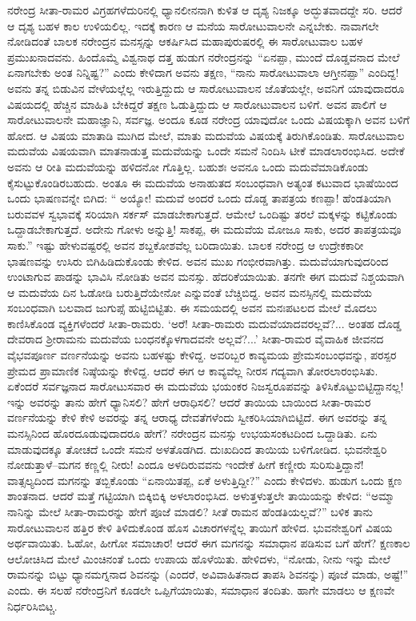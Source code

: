 ನರೇಂದ್ರ ಸೀತಾ-ರಾಮರ ವಿಗ್ರಹಗಳೆದುರಿನಲ್ಲಿ ಧ್ಯಾನಲೀನನಾಗಿ ಕುಳಿತ ಆ ದೃಶ್ಯ ನಿಜಕ್ಕೂ ಅದ್ಭುತವಾದದ್ದೇ ಸರಿ. ಆದರೆ ಆ ದೃಶ್ಯ ಬಹಳ ಕಾಲ ಉಳಿಯಲಿಲ್ಲ. ಇದಕ್ಕೆ ಕಾರಣ ಆ ಮನೆಯ ಸಾರೋಟುವಾಲನೇ ಎನ್ನಬೇಕು. ನಾವಾಗಲೇ ನೋಡಿದಂತೆ ಬಾಲಕ ನರೇಂದ್ರನ ಮನಸ್ಸನ್ನು ಆಕರ್ಷಿಸಿದ ಮಹಾಪುರುಷರಲ್ಲಿ ಈ ಸಾರೋಟುವಾಲ ಬಹಳ ಪ್ರಮುಖನಾದವನು. ಹಿಂದೊಮ್ಮೆ ವಿಶ್ವನಾಥ ದತ್ತ ಹುಡುಗ ನರೇಂದ್ರನನ್ನು “ಏನಪ್ಪಾ, ಮುಂದೆ ದೊಡ್ಡವನಾದ ಮೇಲೆ ಏನಾಗಬೇಕು ಅಂತ ನಿನ್ನಿಷ್ಟ?” ಎಂದು ಕೇಳಿದಾಗ ಅವನು ತಕ್ಷಣ, “ನಾನು ಸಾರೋಟುವಾಲಾ ಆಗ್ತೀನಪ್ಪಾ” ಎಂದಿದ್ದ! ಅವನು ತನ್ನ ಬಿಡುವಿನ ವೇಳೆಯಲ್ಲೆಲ್ಲ ಇರುತ್ತಿದ್ದುದು ಆ ಸಾರೋಟುವಾಲನ ಜೊತೆಯಲ್ಲೇ, ಅವನಿಗೆ ಯಾವುದಾದರೂ ವಿಷಯದಲ್ಲಿ ಹೆಚ್ಚಿನ ಮಾಹಿತಿ ಬೇಕಿದ್ದರೆ ತಕ್ಷಣ ಓಡುತ್ತಿದ್ದುದು ಆ ಸಾರೋಟುವಾಲನ ಬಳಿಗೆ. ಅವನ ಪಾಲಿಗೆ ಆ ಸಾರೋಟುವಾಲನೇ ಮಹಾಜ್ಞಾನಿ, ಸರ್ವಜ್ಞ. ಅಂದೂ ಕೂಡ ನರೇಂದ್ರ ಯಾವುದೋ ಒಂದು ವಿಷಯಕ್ಕಾಗಿ ಅವನ ಬಳಿಗೆ ಹೋದ. ಆ ವಿಷಯ ಮಾತಾಡಿ ಮುಗಿದ ಮೇಲೆ, ಮಾತು ಮದುವೆಯ ವಿಷಯಕ್ಕೆ ತಿರುಗಿಕೊಂಡಿತು. ಸಾರೋಟುವಾಲ ಮದುವೆಯ ವಿಷಯವಾಗಿ ಮಾತನಾಡುತ್ತ ಮದುವೆಯನ್ನು ಒಂದೇ ಸಮನೆ ನಿಂದಿಸಿ ಟೀಕೆ ಮಾಡಲಾರಂಭಿಸಿದ. ಅದೇಕೆ ಅವನು ಆ ರೀತಿ ಮದುವೆಯನ್ನು ಹಳಿದನೋ ಗೊತ್ತಿಲ್ಲ. ಬಹುಶಃ ಅವನೂ ಒಂದು ಮದುವೆಮಾಡಿಕೊಂಡು ಕೈಸುಟ್ಟುಕೊಂಡಿರಬಹುದು. ಅಂತೂ ಈ ಮದುವೆಯ ಅನಾಹುತದ ಸಂಬಂಧವಾಗಿ ಅತ್ಯಂತ ಕಟುವಾದ ಭಾಷೆಯಿಂದ ಒಂದು ಭಾಷಣವನ್ನೇ ಬಿಗಿದ: “ ಅಯ್ಯೋ! ಮದುವೆ ಅಂದರೆ ಒಂದು ದೊಡ್ಡ ತಾಪತ್ರಯ ಕಣಪ್ಪಾ! ಹೆಂಡತಿಯಾಗಿ ಬರುವವಳ ಸ್ವಭಾವಕ್ಕೆ ಸರಿಯಾಗಿ ಸರ್ಕಸ್ ಮಾಡಬೇಕಾಗುತ್ತದೆ. ಆಮೇಲೆ ಒಂದಿಷ್ಟು ತರಲೆ ಮಕ್ಕಳನ್ನು ಕಟ್ಟಿಕೊಂಡು ಒದ್ದಾಡಬೇಕಾಗುತ್ತದೆ. ಅದೇನು ಗೋಳು ಅನ್ನುತ್ತಿ! ಸಾಕಪ್ಪ, ಈ ಮದುವೆಯ ಮೋಜೂ ಸಾಕು, ಅದರ ತಾಪತ್ರಯವೂ ಸಾಕು.” ಇಷ್ಟು ಹೇಳುವಷ್ಟರಲ್ಲಿ ಅವನ ಶಬ್ದಕೋಶವೆಲ್ಲ ಬರಿದಾಯಿತು. ಬಾಲಕ ನರೇಂದ್ರ ಆ ಉದ್ರೇಕಕಾರೀ ಭಾಷಣವನ್ನು ಉಸಿರು ಬಿಗಿಹಿಡಿದುಕೊಂಡು ಕೇಳಿದ. ಅವನ ಮುಖ ಗಂಭೀರವಾಗಿತ್ತು. ಮದುವೆಯಾಗುವುದರಿಂದ ಉಂಟಾಗುವ ಪಾಡನ್ನು ಭಾವಿಸಿ ನೋಡಿತು ಅವನ ಮನಸ್ಸು. ಹೆದರಿಕೆಯಾಯಿತು. ತನಗೇ ಈಗ ಮದುವೆ ನಿಶ್ಚಯವಾಗಿ ಆ ಮದುವೆಯ ದಿನ ಓಡೋಡಿ ಬರುತ್ತಿದೆಯೇನೋ ಎನ್ನುವಂತೆ ಬೆಚ್ಚಿಬಿದ್ದ. ಅವನ ಮನಸ್ಸಿನಲ್ಲಿ ಮದುವೆಯ ಸಂಬಂಧವಾಗಿ ಬಲವಾದ ಜುಗುಪ್ಸೆ ಹುಟ್ಟಿಬಿಟ್ಟಿತು. ಈ ಸಮಯದಲ್ಲಿ ಅವನ ಮನಃಪಟಲದ ಮೇಲೆ ಮೊದಲು ಕಾಣಿಸಿಕೊಂಡ ವ್ಯಕ್ತಿಗಳೆಂದರೆ ಸೀತಾ-ರಾಮರು. ‘ಅರೆ! ಸೀತಾ-ರಾಮರು ಮದುವೆಯಾದವರಲ್ಲವೆ?... ಅಂತಹ ದೊಡ್ಡ ದೇವರಾದ ಶ್ರೀರಾಮನು ಮದುವೆಯ ಬಂಧನಕ್ಕೊಳಗಾದವನೇ ಅಲ್ಲವೆ?...’ ಸೀತಾ-ರಾಮರ ವೈವಾಹಿಕ ಜೀವನದ ವೈಭವಪೂರ್ಣ ವರ್ಣನೆಯನ್ನು ಅವನು ಬಹಳಷ್ಟು ಕೇಳಿದ್ದ. ಅವರಿಬ್ಬರ ಕಾವ್ಯಮಯ ಪ್ರೇಮಸಂಬಂಧವನ್ನು, ಪರಸ್ಪರ ಪ್ರೇಮದ ಪ್ರಾಮಾಣಿಕ ನಿಷ್ಠೆಯನ್ನು ಕೇಳಿದ್ದ. ಆದರೆ ಈಗ ಆ ಕಾವ್ಯವೆಲ್ಲ ನೀರಸ ಗದ್ಯವಾಗಿ ತೋರಲಾರಂಭಿಸಿತು. ಏಕೆಂದರೆ ಸರ್ವಜ್ಞನಾದ ಸಾರೋಟುಸವಾರ ಈ ಮದುವೆಯ ಭಯಂಕರ ನಿಜಸ್ವರೂಪವನ್ನು ತಿಳಿಸಿಕೊಟ್ಟುಬಿಟ್ಟಿದ್ದಾನಲ್ಲ! ಇನ್ನು ಅವರನ್ನು ತಾನು ಹೇಗೆ ಧ್ಯಾನಿಸಲಿ? ಹೇಗೆ ಆರಾಧಿಸಲಿ? ಆದರೆ ತಾಯಿಯ ಬಾಯಿಂದ ಸೀತಾ-ರಾಮರ ವರ್ಣನೆಯನ್ನು ಕೇಳಿ ಕೇಳಿ ಅವರನ್ನು ತನ್ನ ಆರಾಧ್ಯ ದೇವತೆಗಳೆಂದು ಸ್ವೀಕರಿಸಿಯಾಗಿಬಿಟ್ಟಿದೆ. ಈಗ ಅವರನ್ನು ತನ್ನ ಮನಸ್ಸಿನಿಂದ ಹೊರದೂಡುವುದಾದರೂ ಹೇಗೆ? ನರೇಂದ್ರನ ಮನಸ್ಸು ಉಭಯಸಂಕಟದಿಂದ ಒದ್ದಾಡಿತು. ಏನು ಮಾಡುವುದಕ್ಕೂ ತೋಚದೆ ಒಂದೇ ಸಮನೆ ಅಳತೊಡಗಿದ. ದುಃಖದಿಂದ ತಾಯಿಯ ಬಳಿಗೋಡಿದ. ಭುವನೇಶ್ವರಿ ನೋಡುತ್ತಾಳೆ–ಮಗನ ಕಣ್ಣಲ್ಲಿ ನೀರು! ಎಂದೂ ಅಳದಿರುವವನು ಇಂದೇಕೆ ಹೀಗೆ ಕಣ್ಣೀರು ಸುರಿಸುತ್ತಿದ್ದಾನೆ! ವಾತ್ಸಲ್ಯದಿಂದ ಮಗನನ್ನು ತಬ್ಬಿಕೊಂಡು “ಏನಾಯಿತಪ್ಪ, ಏಕೆ ಅಳುತ್ತಿದ್ದೀ?” ಎಂದು ಕೇಳಿದಳು. ಹುಡುಗ ಒಂದು ಕ್ಷಣ ಶಾಂತನಾದ. ಆದರೆ ಮತ್ತೆ ಗಟ್ಟಿಯಾಗಿ ಬಿಕ್ಕಿಬಿಕ್ಕಿ ಅಳಲಾರಂಭಿಸಿದ. ಅಳುತ್ತಳುತ್ತಲೇ ತಾಯಿಯನ್ನು ಕೇಳಿದ: “ಅಮ್ಮಾ ನಾನಿನ್ನು ಮೇಲೆ ಸೀತಾ-ರಾಮರನ್ನು ಹೇಗೆ ಪೂಜೆ ಮಾಡಲಿ? ಸೀತೆ ರಾಮನ ಹೆಂಡತಿಯಲ್ಲವೆ?” ಬಳಿಕ ತಾನು ಸಾರೋಟುವಾಲನ ಹತ್ತಿರ ಕೇಳಿ ತಿಳಿದುಕೊಂಡ ಹೊಸ ವಿಚಾರಗಳನ್ನೆಲ್ಲ ತಾಯಿಗೆ ಹೇಳಿದ. ಭುವನೇಶ್ವರಿಗೆ ವಿಷಯ ಅರ್ಥವಾಯಿತು. ಓಹೋ, ಹೀಗೋ ಸಮಾಚಾರ! ಆದರೆ ಈಗ ಮಗನನ್ನು ಸಮಾಧಾನ ಪಡಿಸುವ ಬಗೆ ಹೇಗೆ? ಕ್ಷಣಕಾಲ ಆಲೋಚಿಸಿದ ಮೇಲೆ ಮಿಂಚಿನಂತೆ ಒಂದು ಉಪಾಯ ಹೊಳೆಯಿತು. ಹೇಳಿದಳು, “ನೋಡು, ನೀನು ಇನ್ನು ಮೇಲೆ ರಾಮನನ್ನು ಬಿಟ್ಟು ಧ್ಯಾನಮಗ್ನನಾದ ಶಿವನನ್ನು (ಎಂದರೆ, ಅವಿವಾಹಿತನಾದ ತಾಪಸಿ ಶಿವನನ್ನು) ಪೂಜೆ ಮಾಡು, ಅಷ್ಟೆ!” ಎಂದು. ಈ ಸಲಹೆ ನರೇಂದ್ರನಿಗೆ ಕೂಡಲೇ ಒಪ್ಪಿಗೆಯಾಯಿತು, ಸಮಾಧಾನ ತಂದಿತು. ಹಾಗೇ ಮಾಡಲು ಆ ಕ್ಷಣವೇ ನಿರ್ಧರಿಸಿಬಿಟ್ಚ.

